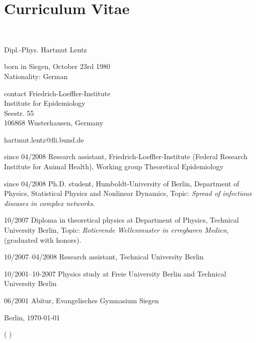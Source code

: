 \chapter*{Curriculum Vitae}

\begin{cv}{~}
  
\begin{cvlist}{\color{Steel}{Personal information}}
  \item Dipl.-Phys. Hartmut Lentz
    \item born in Siegen, October 23rd 1980\\
	Nationality: German
    \item[contact] Friedrich-Loeffler-Institute\\
    Institute for Epidemiology\\
    Seestr. 55\\
    106868 Wusterhausen, Germany
   \item hartmut.lentz@fli.bund.de	

\end{cvlist}

  \begin{cvlist}{\color{Steel}{Education and job history}}
  \item[since 04/2008] Research assistant, Friedrich-Loeffler-Institute (Federal Research Institute for Animal Health), Working group Theoretical Epidemiology
   \item[since 04/2008] Ph.D. student, Humboldt-University of Berlin, Department of
Physics, Statistical Physics and Nonlinear Dynamics, Topic: \emph{Spread of infectious diseases in complex networks}.
  \item[10/2007] Diploma in theoretical physics at Department of Physics, Technical University Berlin, Topic: \emph{Rotierende Wellenmuster in erregbaren Medien}, (graduated with honors).
  \item[10/2007--04/2008] Research assistant, Technical University Berlin
  \item[10/2001--10-2007] Physics study at Freie University Berlin and Technical University Berlin
  \item[06/2001] Abitur, Evangelisches Gymnasium Siegen
  \end{cvlist}

  \date{}
\end{cv}

\vspace{1\baselineskip}
\noindent Berlin, \today   %

\par\hspace{8cm}  ( \authorfirstname \authorsurname)
